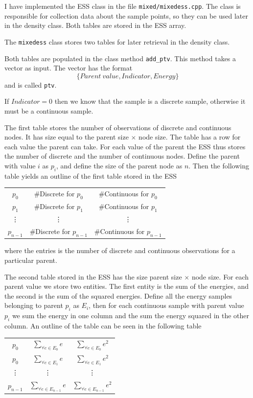 \documentclass[10pt, journal, compsoc, a4paper]{IEEEtran}
\begin{document}
I have implemented the ESS class in the file \texttt{mixed/mixedess.cpp}. The class is responsible for collection data about the sample points, so they can be used later in the density class. Both tables are stored in the ESS array.

The \texttt{mixedess} class stores two tables for later retrieval in the density class. 

Both tables are populated in the class method \texttt{add\_ptv}. This method takes a vector as input. The vector has the format
\begin{equation}
  \{Parent\ value, Indicator, Energy\}
\end{equation}
and is called \texttt{ptv}.


If $Indicator=0$ then we know that the sample is a discrete sample, otherwise it must be a continuous sample.

The first table stores the number of observations of discrete and continuous nodes. It has size equal to the parent size $\times$ node size. The table has a row for each value the parent can take. For each value of the parent the ESS thus stores the number of discrete and the number of continuous nodes. Define the parent with value $i$ as $p_i$, and define the size of the parent node as $n$. Then the following table yields an outline of the first table stored in the ESS
\begin{center}
  \begin{tabular}{c | c | c}
  $p_0$ & \#Discrete for $p_0$ & \#Continuous for $p_0$ \\
  $p_1$ & \#Discrete for $p_1$ & \#Continuous for $p_1$ \\
  \vdots & \vdots & \vdots \\
  $p_{n-1}$ & \#Discrete for $p_{n-1}$ & \#Continuous for $p_{n-1}$ 
  \end{tabular}  
\end{center}
where the entries is the number of discrete and continuous observations for a particular parent.

The second table stored in the ESS has the size parent size $\times$ node size. For each parent value we store two entities. The first entity is the sum of the energies, and the second is the sum of the squared energies. Define all the energy samples belonging to parent $p_i$ as $E_i$, then for each continuous sample with parent value $p_i$ we sum the energy in one column and the sum the energy squared in the other column. An outline of the table can be seen in the following table
\begin{center}
  \begin{tabular}{c | c | c}
  $p_0$ & $\sum_{\forall e \in E_0} e$ & $\sum_{\forall e \in E_0} e^2$ \\
  $p_0$ & $\sum_{\forall e \in E_1} e$ & $\sum_{\forall e \in E_1} e^2$ \\
  \vdots & \vdots & \vdots \\
  $p_{n-1}$ & $\sum_{\forall e \in E_{n-1}} e$ & $\sum_{\forall e \in E_{n-1}} e^2$ \\
  \end{tabular}  
\end{center}         
\end{document}
